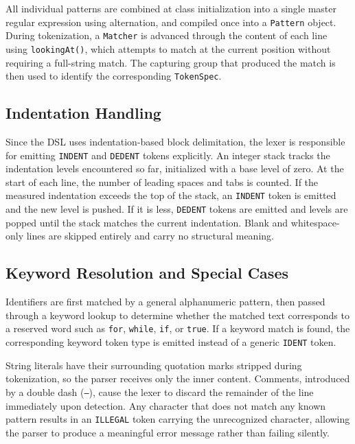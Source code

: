All individual patterns are combined at class initialization into a single master regular expression using alternation, and compiled once into a \texttt{Pattern} object. During tokenization, a \texttt{Matcher} is advanced through the content of each line using \texttt{lookingAt()}, which attempts to match at the current position without requiring a full-string match. The capturing group that produced the match is then used to identify the corresponding \texttt{TokenSpec}.

\subsection{Indentation Handling}

Since the DSL uses indentation-based block delimitation, the lexer is responsible for emitting \texttt{INDENT} and \texttt{DEDENT} tokens explicitly. 
An integer stack tracks the indentation levels encountered so far, initialized with a base level of zero. At the start of each line, the number of leading spaces and tabs is counted. 
If the measured indentation exceeds the top of the stack, an \texttt{INDENT} token is emitted and the new level is pushed. If it is less, \texttt{DEDENT} tokens are emitted and levels are popped until the stack matches the current indentation. 
Blank and whitespace-only lines are skipped entirely and carry no structural meaning.

\subsection{Keyword Resolution and Special Cases}

Identifiers are first matched by a general alphanumeric pattern, then passed through a keyword lookup to determine whether the matched text corresponds to a reserved word such as \texttt{for}, \texttt{while}, \texttt{if}, or \texttt{true}. If a keyword match is found, the corresponding keyword token type is emitted instead of a generic \texttt{IDENT} token.

String literals have their surrounding quotation marks stripped during tokenization, so the parser receives only the inner content. Comments, introduced by a double dash (\texttt{--}), cause the lexer to discard the remainder of the line immediately upon detection. Any character that does not match any known pattern results in an \texttt{ILLEGAL} token carrying the unrecognized character, allowing the parser to produce a meaningful error message rather than failing silently.


